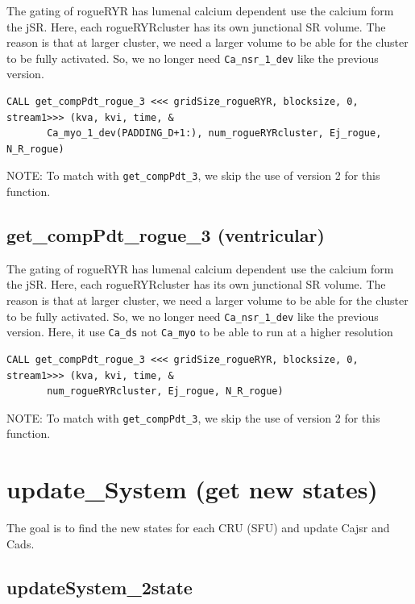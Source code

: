 The gating of rogueRYR has lumenal calcium dependent use the calcium form the
jSR. Here, each rogueRYRcluster has its own junctional SR volume. The reason is
that at larger cluster, we need a larger volume to be able for the cluster to be
fully activated. So, we no longer need \verb!Ca_nsr_1_dev! like the previous
version.
{\small 
\begin{verbatim}
CALL get_compPdt_rogue_3 <<< gridSize_rogueRYR, blocksize, 0, stream1>>> (kva, kvi, time, &                                                                                                                          
       Ca_myo_1_dev(PADDING_D+1:), num_rogueRYRcluster, Ej_rogue, N_R_rogue)
\end{verbatim}
}

NOTE: To match with \verb!get_compPdt_3!, we skip the use of version 2 for this
function.

\subsection{get\_compPdt\_rogue\_3 (ventricular)}
\label{sec:get_compPdt_rogue}

The gating of rogueRYR has lumenal calcium dependent use the calcium form the
jSR. Here, each rogueRYRcluster has its own junctional SR volume. The reason is
that at larger cluster, we need a larger volume to be able for the cluster to be
fully activated. So, we no longer need \verb!Ca_nsr_1_dev! like the previous
version. Here, it use \verb!Ca_ds! not \verb!Ca_myo! to be able to run at a
higher resolution
{\small
\begin{verbatim}
CALL get_compPdt_rogue_3 <<< gridSize_rogueRYR, blocksize, 0, stream1>>> (kva, kvi, time, &                                                                                                                          
       num_rogueRYRcluster, Ej_rogue, N_R_rogue)
\end{verbatim}
}

NOTE: To match with \verb!get_compPdt_3!, we skip the use of version 2 for this
function.

\section{update\_System (get new states)}
\label{sec:update_System}

The goal is to find the new states for each CRU (SFU) and update Cajsr and Cads. 

\subsection{updateSystem\_2state}


